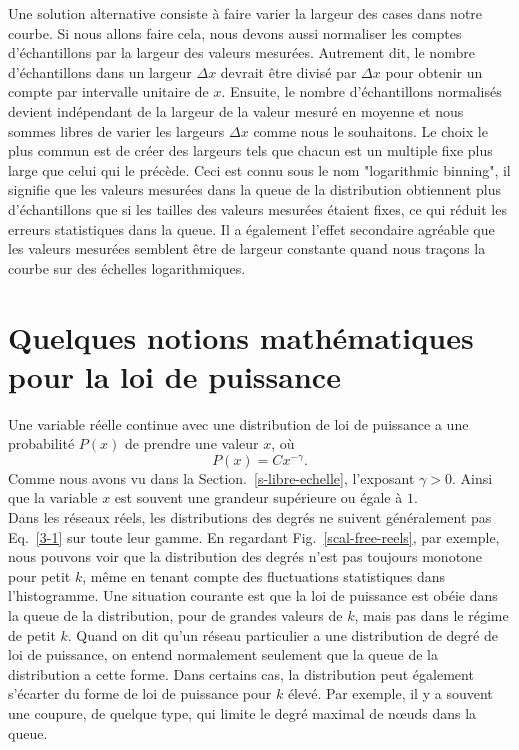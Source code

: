 Une solution alternative consiste à faire varier la largeur des cases dans notre courbe. Si nous allons faire cela, nous devons aussi normaliser les comptes d'échantillons par la largeur des valeurs mesurées. Autrement dit, le nombre d'échantillons dans un largeur $\Delta x$ devrait être divisé par $\Delta x$ pour obtenir un compte par intervalle unitaire de $x$. Ensuite, le nombre d'échantillons normalisés devient indépendant de la largeur de la valeur mesuré en moyenne et nous sommes libres de varier les largeurs $\Delta x$ comme nous le souhaitons. Le choix le plus commun est de créer des largeurs tels que chacun est un multiple fixe plus large que celui qui le précède. Ceci est connu sous le nom "logarithmic binning", il signifie que les valeurs mesurées dans la queue de la distribution obtiennent plus d'échantillons que si les tailles des valeurs mesurées étaient fixes, ce qui réduit les erreurs statistiques dans la queue. Il a également l'effet secondaire agréable que les valeurs mesurées semblent être de largeur constante quand nous traçons la courbe sur des échelles logarithmiques.
\section{Quelques notions mathématiques pour la loi de puissance}
Une variable réelle continue avec une distribution de loi de puissance a une probabilité $P(x)$ de prendre une valeur $x$, où
\begin{equation}
P(x)=Cx^{-\gamma}.
\label{3-1}
\end{equation}
Comme nous avons vu dans la Section.~\ref{s-libre-echelle}, l'exposant $\gamma>0$. Ainsi que la variable $x$ est souvent une grandeur supérieure ou égale à $1$.\\
Dans les réseaux réels, les distributions des degrés ne suivent généralement pas Eq.~\eqref{3-1} sur toute leur gamme.
En regardant Fig.~\ref{scal-free-reels}, par exemple, nous pouvons voir que la distribution des degrés n'est pas toujours monotone pour petit $k$, même en tenant compte des fluctuations statistiques dans l'histogramme. Une situation courante est que la loi de puissance est obéie dans la queue de la distribution, pour de grandes valeurs de $k$, mais pas dans le régime de petit $k$. Quand on dit qu'un réseau particulier a une distribution de degré de loi de puissance, on entend normalement seulement que la queue de la distribution a cette forme. Dans certains cas, la distribution peut également s'écarter du forme de loi de puissance pour $k$ élevé. Par exemple, il y a souvent une coupure, de quelque type, qui limite le degré maximal de nœuds dans la queue.
 
